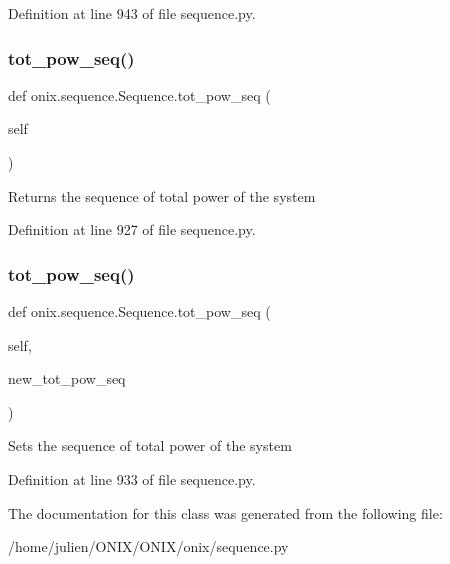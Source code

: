 Definition at line 943 of file sequence.\+py.

\mbox{\label{classonix_1_1sequence_1_1Sequence_a486a4d2cae250caed5c2ca84adb09c74}} 
\subsubsection{\texorpdfstring{tot\+\_\+pow\+\_\+seq()}{tot\_pow\_seq()}\hspace{0.1cm}{\footnotesize\ttfamily [1/2]}}
{\footnotesize\ttfamily def onix.\+sequence.\+Sequence.\+tot\+\_\+pow\+\_\+seq (\begin{DoxyParamCaption}\item[{}]{self }\end{DoxyParamCaption})}

\begin{DoxyVerb}Returns the sequence of total power of the system
\end{DoxyVerb}
 

Definition at line 927 of file sequence.\+py.

\mbox{\label{classonix_1_1sequence_1_1Sequence_a7e4da78acea29975929ca4dbded27daa}} 
\subsubsection{\texorpdfstring{tot\+\_\+pow\+\_\+seq()}{tot\_pow\_seq()}\hspace{0.1cm}{\footnotesize\ttfamily [2/2]}}
{\footnotesize\ttfamily def onix.\+sequence.\+Sequence.\+tot\+\_\+pow\+\_\+seq (\begin{DoxyParamCaption}\item[{}]{self,  }\item[{}]{new\+\_\+tot\+\_\+pow\+\_\+seq }\end{DoxyParamCaption})}

\begin{DoxyVerb}Sets the sequence of total power of the system
\end{DoxyVerb}
 

Definition at line 933 of file sequence.\+py.



The documentation for this class was generated from the following file\+:\begin{DoxyCompactItemize}
\item 
/home/julien/\+O\+N\+I\+X/\+O\+N\+I\+X/onix/sequence.\+py\end{DoxyCompactItemize}
